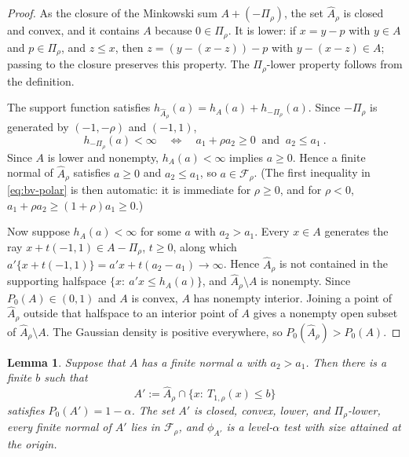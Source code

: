 \documentclass[11pt]{article}
\numberwithin{equation}{section}
\newtheorem{lemma}{Lemma}
\theoremstyle{definition}
\begin{document}
\begin{proof}
As the closure of the Minkowski sum $A+(-\Pi_\rho)$, the set $\widehat A_\rho$ is closed and convex, and it contains $A$ because $0\in\Pi_\rho$. It is lower: if $x=y-p$ with $y\in A$ and $p\in\Pi_\rho$, and $z\le x$, then $z=(y-(x-z))-p$ with $y-(x-z)\in A$; passing to the closure preserves this property. The $\Pi_\rho$-lower property follows from the definition.

The support function satisfies $h_{\widehat A_\rho}(a)=h_A(a)+h_{-\Pi_\rho}(a)$. Since $-\Pi_\rho$ is generated by $(-1,-\rho)$ and $(-1,1)$,
\begin{equation}\label{eq:bv-polar}
h_{-\Pi_\rho}(a)<\infty
\quad\Longleftrightarrow\quad
a_1+\rho a_2\ge0
\ \text{ and }\
a_2\le a_1~.
\end{equation}
Since $A$ is lower and nonempty, $h_A(a)<\infty$ implies $a\ge0$. Hence a finite normal of $\widehat A_\rho$ satisfies $a\ge0$ and $a_2\le a_1$, so $a\in\mathcal F_\rho$. (The first inequality in \eqref{eq:bv-polar} is then automatic: it is immediate for $\rho\ge0$, and for $\rho<0$, $a_1+\rho a_2\ge(1+\rho)a_1\ge0$.)

Now suppose $h_A(a)<\infty$ for some $a$ with $a_2>a_1$. Every $x\in A$ generates the ray $x+t(-1,1)\in A-\Pi_\rho$, $t\ge0$, along which $a'\{x+t(-1,1)\}=a'x+t(a_2-a_1)\to\infty$. Hence $\widehat A_\rho$ is not contained in the supporting halfspace $\{x:\ a'x\le h_A(a)\}$, and $\widehat A_\rho\setminus A$ is nonempty. Since $P_0(A)\in(0,1)$ and $A$ is convex, $A$ has nonempty interior. Joining a point of $\widehat A_\rho$ outside that halfspace to an interior point of $A$ gives a nonempty open subset of $\widehat A_\rho\setminus A$. The Gaussian density is positive everywhere, so $P_0(\widehat A_\rho)>P_0(A)$.
\end{proof}

\begin{lemma}\label{lem:bv-competitor}
Suppose that $A$ has a finite normal $a$ with $a_2>a_1$. Then there is a finite $b$ such that
\[
A':=\widehat A_\rho\cap\{x:\ T_{1,\rho}(x)\le b\}
\]
satisfies $P_0(A')=1-\alpha$. The set $A'$ is closed, convex, lower, and $\Pi_\rho$-lower, every finite normal of $A'$ lies in $\mathcal F_\rho$, and $\phi_{A'}$ is a level-$\alpha$ test with size attained at the origin.
\end{lemma}
\end{document}

